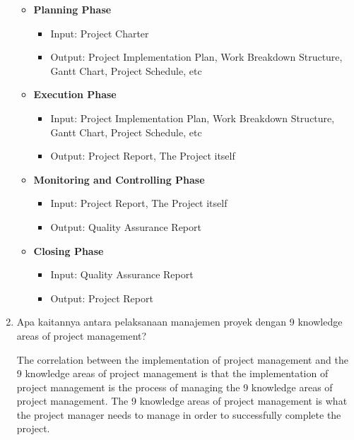 \documentclass[12pt,titlepage]{article}
\begin{document}
\begin{enumerate}
{\begin{itemize}
{                \textbf{Initialisation Phase}
                \begin{itemize}
                    \item Input: Ideas from the Project Owner
                    \item Output: Project Proposal, Project Charter
                \end{itemize}
            }
            \item {
                \textbf{Planning Phase}
                \begin{itemize}
                    \item Input: Project Charter
                    \item Output: Project Implementation Plan, Work Breakdown Structure, Gantt Chart, Project Schedule, etc
                \end{itemize}
            }
            \item {
                \textbf{Execution Phase}
                \begin{itemize}
                    \item Input: Project Implementation Plan, Work Breakdown Structure, Gantt Chart, Project Schedule, etc
                    \item Output: Project Report, The Project itself
                \end{itemize}
            }
            \item {
                \textbf{Monitoring and Controlling Phase}
                \begin{itemize}
                    \item Input: Project Report, The Project itself
                    \item Output: Quality Assurance Report
                \end{itemize}
            }
            \item {
                \textbf{Closing Phase}
                \begin{itemize}
                    \item Input: Quality Assurance Report
                    \item Output: Project Report
                \end{itemize}
            }
        \end{itemize}
    }
    \item {
        Apa kaitannya antara pelaksanaan manajemen proyek dengan 9 knowledge areas of project management?

        The correlation between the implementation of project management and the 9 knowledge areas of project management is that the implementation of project management is the process of managing the 9 knowledge areas of project management.
        The 9 knowledge areas of project management is what the project manager needs to manage in order to successfully
        complete the project.
    }
\end{enumerate}
\end{document}
